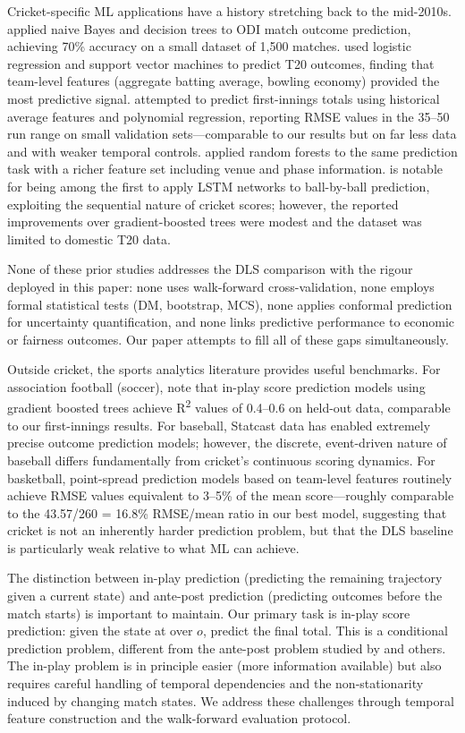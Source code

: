 \documentclass[10pt,a4paper,twocolumn]{article}
\begin{document}
Cricket-specific ML applications have a history stretching back to the mid-2010s. \citet{Sankaranarayanan2014} applied naive Bayes and decision trees to ODI match outcome prediction, achieving 70\% accuracy on a small dataset of 1,500 matches. \citet{Kampakis2015} used logistic regression and support vector machines to predict T20 outcomes, finding that team-level features (aggregate batting average, bowling economy) provided the most predictive signal. \citet{Jhanwar2016} attempted to predict first-innings totals using historical average features and polynomial regression, reporting RMSE values in the 35--50 run range on small validation sets---comparable to our results but on far less data and with weaker temporal controls. \citet{Passi2018} applied random forests to the same prediction task with a richer feature set including venue and phase information. \citet{Viswanadha2017} is notable for being among the first to apply LSTM networks to ball-by-ball prediction, exploiting the sequential nature of cricket scores; however, the reported improvements over gradient-boosted trees were modest and the dataset was limited to domestic T20 data.

None of these prior studies addresses the DLS comparison with the rigour deployed in this paper: none uses walk-forward cross-validation, none employs formal statistical tests (DM, bootstrap, MCS), none applies conformal prediction for uncertainty quantification, and none links predictive performance to economic or fairness outcomes. Our paper attempts to fill all of these gaps simultaneously.

Outside cricket, the sports analytics literature provides useful benchmarks. For association football (soccer), \citet{Bunker2019} note that in-play score prediction models using gradient boosted trees achieve R\textsuperscript{2} values of 0.4--0.6 on held-out data, comparable to our first-innings results. For baseball, Statcast data has enabled extremely precise outcome prediction models; however, the discrete, event-driven nature of baseball differs fundamentally from cricket's continuous scoring dynamics. For basketball, point-spread prediction models based on team-level features routinely achieve RMSE values equivalent to 3--5\% of the mean score---roughly comparable to the 43.57/260 = 16.8\% RMSE/mean ratio in our best model, suggesting that cricket is not an inherently harder prediction problem, but that the DLS baseline is particularly weak relative to what ML can achieve.

The distinction between in-play prediction (predicting the remaining trajectory given a current state) and ante-post prediction (predicting outcomes before the match starts) is important to maintain. Our primary task is in-play score prediction: given the state at over $o$, predict the final total. This is a conditional prediction problem, different from the ante-post problem studied by \citet{Kampakis2015} and others. The in-play problem is in principle easier (more information available) but also requires careful handling of temporal dependencies and the non-stationarity induced by changing match states. We address these challenges through temporal feature construction and the walk-forward evaluation protocol.
\end{document}
